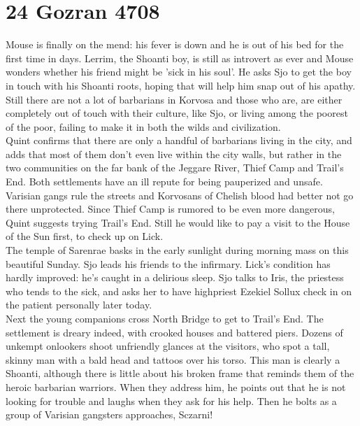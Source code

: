 \section{24 Gozran 4708}

Mouse is finally on the mend: his fever is down and he is out of his bed for the first time in days. Lerrim, the Shoanti boy, is still as introvert as ever and Mouse wonders whether his friend might be 'sick in his soul'. He asks Sjo to get the boy in touch with his Shoanti roots, hoping that will help him snap out of his apathy. Still there are not a lot of barbarians in Korvosa and those who are, are either completely out of touch with their culture, like Sjo, or living among the poorest of the poor, failing to make it in both the wilds and civilization.\\

Quint confirms that there are only a handful of barbarians living in the city, and adds that most of them don't even live within the city walls, but rather in the two communities on the far bank of the Jeggare River, Thief Camp and Trail's End. Both settlements have an ill repute for being pauperized and unsafe. Varisian gangs rule the streets and Korvosans of Chelish blood had better not go there unprotected. Since Thief Camp is rumored to be even more dangerous, Quint suggests trying Trail's End. Still he would like to pay a visit to the House of the Sun first, to check up on Lick.\\

The temple of Sarenrae basks in the early sunlight during morning mass on this beautiful Sunday. Sjo leads his friends to the infirmary. Lick's condition has hardly improved: he's caught in a delirious sleep. Sjo talks to Iris, the priestess who tends to the sick, and asks her to have highpriest Ezekiel Sollux check in on the patient personally later today.\\

Next the young companions cross North Bridge to get to Trail's End. The settlement is dreary indeed, with crooked houses and battered piers. Dozens of unkempt onlookers shoot unfriendly glances at the visitors, who spot a tall, skinny man with a bald head and tattoos over his torso. This man is clearly a Shoanti, although there is little about his broken frame that reminds them of the heroic barbarian warriors. When they address him, he points out that he is not looking for trouble and laughs when they ask for his help. Then he bolts as a group of Varisian gangsters approaches, Sczarni!\\

